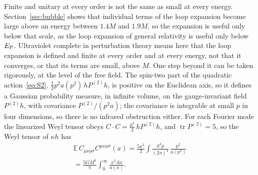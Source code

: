 \documentclass[a4paper,11pt]{article}
\newcommand{\bE}{\mathbb{E}}
\newcommand{\dd}{\mathrm{d}}
\newcommand{\Pt}{P^{(2)}}
\begin{document}
Finite and unitary at every order is not the same as small at every energy. Section~\ref{sec:bubble} shows that individual terms of the loop expansion become large above an energy between $1.4M$ and $1.9M$, so the expansion is useful only below that scale, as the loop expansion of general relativity is useful only below $E_{\rm P}$. Ultraviolet complete in perturbation theory means here that the loop expansion is defined and finite at every order and at every energy, not that it converges, or that its terms are small, above $M$. One step beyond it can be taken rigorously, at the level of the free field. The spin-two part of the quadratic action~\eqref{eq:S2}, $\frac12p^2a(p^2)\,h\Pt h$, is positive on the Euclidean axis, so it defines a Gaussian probability measure, in infinite volume, on the gauge-invariant field $\Pt h$, with covariance $\Pt/(p^2a)$; the covariance is integrable at small $p$ in four dimensions, so there is no infrared obstruction either. For each Fourier mode the linearized Weyl tensor obeys $C\cdot C=\frac{p^4}2\,h\Pt h$, and $\operatorname{tr}\Pt=5$, so the Weyl tensor of $\kappa h$ has
\begin{multline}
\label{eq:weyl}
\bE\,C_{\mu\nu\rho\sigma}C^{\mu\nu\rho\sigma}(x)=\frac{5\kappa^2}2\int\frac{\dd^4p}{(2\pi)^4}\,\frac{p^2}{a(p^2)}\\
=\frac{5GM^6}{\pi}\int_0^\infty\frac{x^2\,\dd x}{a(x)} .
\end{multline}
\end{document}
